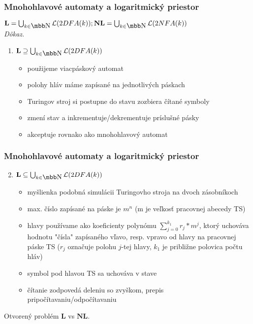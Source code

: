 \documentclass[slovak]{beamer}
\begin{document}
\begin{frame}
\frametitle{Mnohohlavové automaty a logaritmický priestor}

\cveta
$\textbf{L} = \bigcup_{k \in \N } \mathcal{L} (2DFA(k)); \textbf{NL} = \bigcup_{k \in \N } \mathcal{L} (2NFA(k)) $ \\
\emph{Dôkaz.} \\
\begin{enumerate}
\item $\textbf{L} \supseteq \bigcup_{k \in \N } \mathcal{L} (2DFA(k)) $ \\
\begin{itemize}
\item použijeme viacpáskový automat
\item polohy hláv máme zapísané na jednotlivých páskach
\item Turingov stroj si postupne do stavu zozbiera čítané symboly
\item zmení stav a inkrementuje/dekrementuje príslušné pásky
\item akceptuje rovnako ako mnohohlavový automat
\end{itemize}
\end{enumerate}

\end{frame}

\begin{frame}
\frametitle{Mnohohlavové automaty a logaritmický priestor}

\begin{enumerate}
\setcounter{enumi}{1}
\item $\textbf{L} \subseteq \bigcup_{k \in \N } \mathcal{L} (2DFA(k)) $ \\
\begin{itemize}
\item myšlienka podobná simulácii Turingovho stroja na dvoch zásobníkoch
\item max. číslo zapísané na páske je $m^{n}$ (m je veľkosť pracovnej abecedy TS)
\item hlavy používame ako koeficienty polynómu $\sum_{j=0}^{k_1} r_{j}*m^{j}$, ktorý uchováva hodnotu "čísla" zapísaného vľavo, resp. vpravo od hlavy na pracovnej páske TS ($r_{j}$ označuje polohu $j$-tej hlavy, ${k_1}$ je približne polovica počtu hláv)
\item symbol pod hlavou TS sa uchováva v stave
\item čítanie zodpovedá deleniu so zvyškom, prepis pripočítavaniu/odpočítavaniu
\end{itemize}
\end{enumerate}

Otvorený problém $\textbf{L}$ vs $\textbf{NL}$.
\end{frame}
\end{document}
